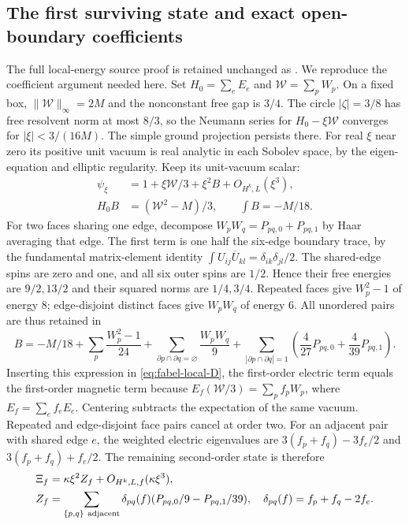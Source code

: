 \subsection{The first surviving state and exact open-boundary coefficients}
The full local-energy source proof is retained unchanged as
. We reproduce the
coefficient argument needed here. Set $H_0=\sum_eE_e$ and
$\mathcal W=\sum_pW_p$. On a fixed box, $\|\mathcal W\|_\infty=2M$ and
the nonconstant free gap is $3/4$.
The circle $|\zeta|=3/8$ has free resolvent norm at most $8/3$, so the
Neumann series for $H_0-\xi\mathcal W$ converges for $|\xi|<3/(16M)$.
The simple ground projection persists there. For real $\xi$ near zero
its positive unit vacuum is real analytic in each Sobolev space, by the
eigen-equation and elliptic regularity. Keep its unit-vacuum scalar:
\begin{align*}
 \psi_\xi&=1+\xi\mathcal W/3+\xi^2 B+O_{H^k,L}(\xi^3),\\
 H_0B&=(\mathcal W^2-M)/3,\qquad \int B=-M/18.
\end{align*}
For two faces sharing one edge, decompose
$W_pW_q=P_{pq,0}+P_{pq,1}$ by Haar averaging that edge.
The first term is one half the six-edge boundary trace, by the
fundamental matrix-element identity $\int U_{ij}\overline U_{kl}
=\delta_{ik}\delta_{jl}/2$.
The shared-edge spins are zero and one, and all six outer spins
are $1/2$. Hence their free energies are $9/2,13/2$ and their squared
norms are $1/4,3/4$.
Repeated faces give $W_p^2-1$ of energy $8$; edge-disjoint distinct faces
give $W_pW_q$ of energy $6$. All unordered pairs are thus retained in
\[
 B=-M/18+\sum_p\frac{W_p^2-1}{24}
  +\sum_{\partial p\cap\partial q=\varnothing}\frac{W_pW_q}{9}
  +\sum_{|\partial p\cap\partial q|=1}
       \left(\frac4{27}P_{pq,0}+\frac4{39}P_{pq,1}\right).
\]
Inserting this expression in \eqref{eq:fabel-local-D}, the first-order
electric term equals the first-order magnetic term because
$E_f(\mathcal W/3)=\sum_pf_pW_p$, where $E_f=\sum_ef_eE_e$.
Centering subtracts the expectation of the same vacuum.
Repeated and edge-disjoint face pairs cancel at order two.
For an adjacent pair with shared edge $e$, the weighted electric
eigenvalues are $3(f_p+f_q)-3f_e/2$ and $3(f_p+f_q)+f_e/2$.
The remaining second-order state is therefore
\begin{align}
 \Xi_f&=\kappa\xi^2 Z_f+O_{H^k,L,f}(\kappa\xi^3),\nonumber\\
 Z_f&=\sum_{\{p,q\}\ {\rm adjacent}}\delta_{pq}(f)
         (P_{pq,0}/9-P_{pq,1}/39),\quad
 \delta_{pq}(f)=f_p+f_q-2f_e. \label{eq:fabel-adjacent-state}
\end{align}

